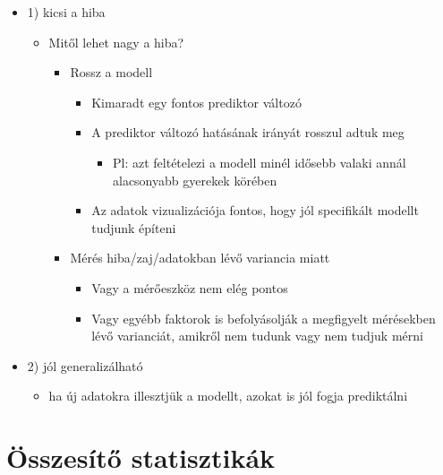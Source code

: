 \documentclass[
  letterpaper,
  DIV=11,
  numbers=noendperiod]{scrreprt}
\providecommand{\tightlist}{%
  \setlength{\itemsep}{0pt}\setlength{\parskip}{0pt}}\usepackage{longtable,booktabs,array}
\begin{document}
\begin{itemize}
\item
  1) kicsi a hiba

  \begin{itemize}
  \item
    Mitől lehet nagy a hiba?

    \begin{itemize}
    \item
      Rossz a modell

      \begin{itemize}
      \item
        Kimaradt egy fontos prediktor változó
      \item
        A prediktor változó hatásának irányát rosszul adtuk meg

        \begin{itemize}
        \tightlist
        \item
          Pl: azt feltételezi a modell minél idősebb valaki annál
          alacsonyabb gyerekek körében
        \end{itemize}
      \item
        Az adatok vizualizációja fontos, hogy jól specifikált modellt
        tudjunk építeni
      \end{itemize}
    \item
      Mérés hiba/zaj/adatokban lévő variancia miatt

      \begin{itemize}
      \item
        Vagy a mérőeszköz nem elég pontos
      \item
        Vagy egyébb faktorok is befolyásolják a megfigyelt mérésekben
        lévő varianciát, amikről nem tudunk vagy nem tudjuk mérni
      \end{itemize}
    \end{itemize}
  \end{itemize}
\item
  2) jól generalizálható

  \begin{itemize}
  \tightlist
  \item
    ha új adatokra illesztjük a modellt, azokat is jól fogja prediktálni
  \end{itemize}
\end{itemize}

\hypertarget{uxf6sszesuxedtux151-statisztikuxe1k}{%
\section{Összesítő
statisztikák}\label{uxf6sszesuxedtux151-statisztikuxe1k}}
\end{document}

